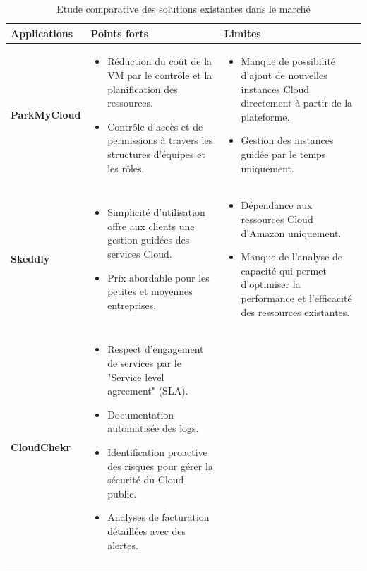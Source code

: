 \begin{table}[H]
	
	\caption{Etude comparative des solutions existantes dans le marché}
	\label{Etude comparative des solutions existantes dans le marché}
	
	\begin{tabular}{|p{2.8cm}|p{6.2cm}|p{5.7cm}|}
		\hline
		\textbf{Applications} & \textbf{Points forts}& \textbf{Limites}\\
		\hline
		\textbf{ParkMyCloud} & \begin{itemize}
			\item Réduction du  coût de la VM par le contrôle et la planification des ressources.
			\item  Contrôle d'accès et de permissions à travers les structures d'équipes et les rôles. 
			
		\end{itemize}         
		& \begin{itemize}
			\item Manque de possibilité d'ajout de nouvelles instances Cloud directement à partir de la plateforme.
			\item Gestion des instances guidée par le temps uniquement.
		\end{itemize}\\    
		\hline
		\textbf{Skeddly} & \begin{itemize}
			\item Simplicité d'utilisation offre aux clients une gestion guidées des services Cloud.
			\item Prix abordable pour les petites  et moyennes entreprises. 
			
		\end{itemize}         
		& \begin{itemize}
			\item Dépendance aux ressources Cloud d'Amazon uniquement.
			\item Manque de l'analyse de capacité qui permet d'optimiser  la performance et l'efficacité des ressources existantes.
		\end{itemize}\\    
		\hline
		\textbf{CloudChekr} & \begin{itemize}
			\item Respect d'engagement de services par le "Service level agreement" (SLA).
			\item  Documentation automatisée des logs.
			\item  Identification proactive des risques pour gérer la sécurité du Cloud public. 
			\item Analyses de facturation détaillées avec des alertes.
			

\end{itemize}
\end{tabular}
\end{table}
